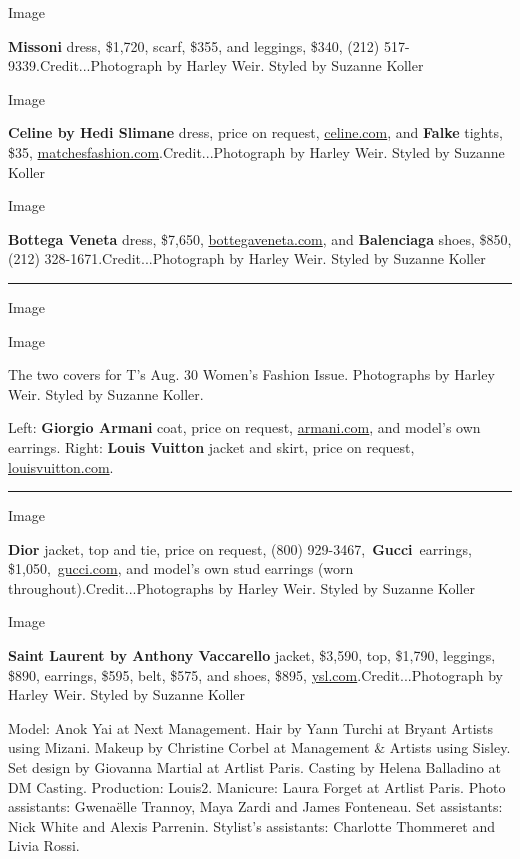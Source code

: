 Image

\textbf{Missoni} dress, \$1,720, scarf, \$355, and leggings, \$340,
(212) 517-9339.Credit...Photograph by Harley Weir. Styled by Suzanne
Koller

Image

\textbf{Celine by Hedi Slimane} dress, price on request,
\href{https://www.celine.com}{celine.com}, and \textbf{Falke} tights,
\$35,
\href{https://www.matchesfashion.com}{matchesfashion.com}.Credit...Photograph
by Harley Weir. Styled by Suzanne Koller

Image

\textbf{Bottega Veneta} dress, \$7,650,
\href{https://www.bottegaveneta.com}{bottegaveneta.com}, and
\textbf{Balenciaga} shoes, \$850, (212) 328-1671.Credit...Photograph by
Harley Weir. Styled by Suzanne Koller

\begin{center}\rule{0.5\linewidth}{\linethickness}\end{center}

Image

Image

The two covers for T's Aug. 30 Women's Fashion Issue. Photographs by
Harley Weir. Styled by Suzanne Koller.

Left: \textbf{Giorgio Armani} coat, price on request,
\href{https://armani.com}{armani.com}, and model's own earrings. Right:
\textbf{Louis Vuitton} jacket and skirt, price on request,
\href{https://louisvuitton.com}{louisvuitton.com}.

\begin{center}\rule{0.5\linewidth}{\linethickness}\end{center}

Image

\textbf{Dior} jacket, top and tie, price on request, (800)
929-3467,~\textbf{Gucci}~earrings,
\$1,050,~\href{”https://www.gucci.com”}{gucci.com}, and model's own stud
earrings (worn throughout).Credit...Photographs by Harley Weir. Styled
by Suzanne Koller

Image

\textbf{Saint Laurent by Anthony Vaccarello} jacket, \$3,590, top,
\$1,790, leggings, \$890, earrings, \$595, belt, \$575, and shoes,
\$895, \href{https://www.ysl.com}{ysl.com}.Credit...Photograph by Harley
Weir. Styled by Suzanne Koller

Model: Anok Yai at Next Management. Hair by Yann Turchi at Bryant
Artists using Mizani. Makeup by Christine Corbel at Management \&
Artists using Sisley. Set design by Giovanna Martial at Artlist Paris.
Casting by Helena Balladino at DM Casting. Production: Louis2. Manicure:
Laura Forget at Artlist Paris. Photo assistants: Gwenaëlle Trannoy, Maya
Zardi and James Fonteneau. Set assistants: Nick White and Alexis
Parrenin. Stylist's assistants: Charlotte Thommeret and Livia Rossi.

